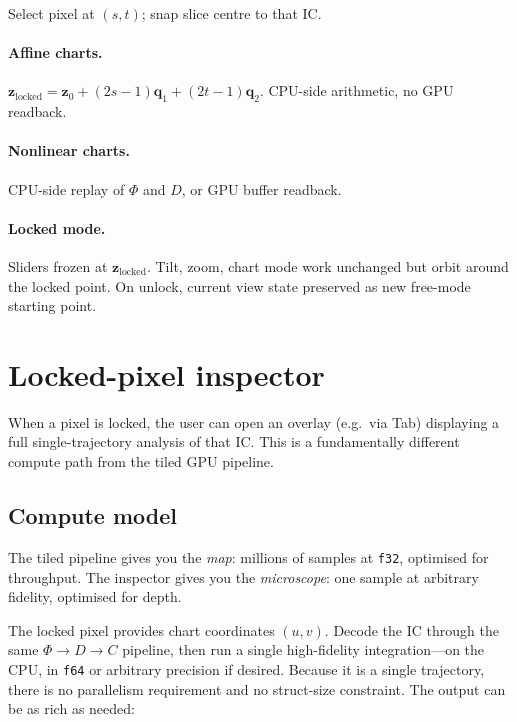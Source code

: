 \documentclass[11pt]{report}
\begin{document}
Select pixel at $(s,t)$; snap slice centre to that IC.

\paragraph{Affine charts.} $\mathbf z_{\mathrm{locked}} = \mathbf z_0 + (2s-1)\mathbf q_1 + (2t-1)\mathbf q_2$. CPU-side arithmetic, no GPU readback.

\paragraph{Nonlinear charts.} CPU-side replay of $\Phi$ and $D$, or GPU buffer readback.

\paragraph{Locked mode.} Sliders frozen at $\mathbf z_{\mathrm{locked}}$. Tilt, zoom, chart mode work unchanged but orbit around the locked point. On unlock, current view state preserved as new free-mode starting point.

\section{Locked-pixel inspector}
\label{sec:inspector}

When a pixel is locked, the user can open an overlay (e.g.\ via Tab) displaying a full single-trajectory analysis of that IC. This is a fundamentally different compute path from the tiled GPU pipeline.

\subsection{Compute model}

The tiled pipeline gives you the \emph{map}: millions of samples at \texttt{f32}, optimised for throughput. The inspector gives you the \emph{microscope}: one sample at arbitrary fidelity, optimised for depth.

The locked pixel provides chart coordinates $(u,v)$. Decode the IC through the same $\Phi\to D\to C$ pipeline, then run a single high-fidelity integration---on the CPU, in \texttt{f64} or arbitrary precision if desired. Because it is a single trajectory, there is no parallelism requirement and no struct-size constraint. The output can be as rich as needed:
\end{document}
